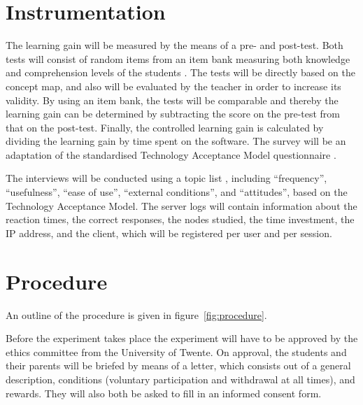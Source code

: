 \documentclass[11pt,twoside]{report} %
\begin{document}
\section{Instrumentation}



The learning gain will be measured by the means of a pre- and post-test. Both tests will consist of random items from an item bank measuring both knowledge and comprehension levels of the students \cite{bloom}. The tests will be directly based on the concept map, and also will be evaluated by the teacher in order to increase its validity. By using an item bank, the tests will be comparable and thereby the learning gain can be determined by subtracting the score on the pre-test from that on the post-test. Finally, the controlled learning gain is calculated by dividing the learning gain by time spent on the software. The survey will be an adaptation of the standardised Technology Acceptance Model questionnaire .

The interviews will be conducted using a topic list \cite{baarda}, including “frequency”, “usefulness”, “ease of use”, “external conditions”, and “attitudes”, based on the Technology Acceptance Model. The server logs will contain information about the reaction times, the correct responses, the nodes studied, the time investment, the IP address, and the client, which will be registered per user and per session.

\section{Procedure}



An outline of the procedure is given in figure~\ref{fig:procedure}.

Before the experiment takes place the experiment will have to be approved by the ethics committee from the University of Twente. On approval, the students and their parents will be briefed by means of a letter, which consists out of a general description, conditions (voluntary participation and withdrawal at all times), and rewards. They will also both be asked to fill in an informed consent form.
\end{document}

